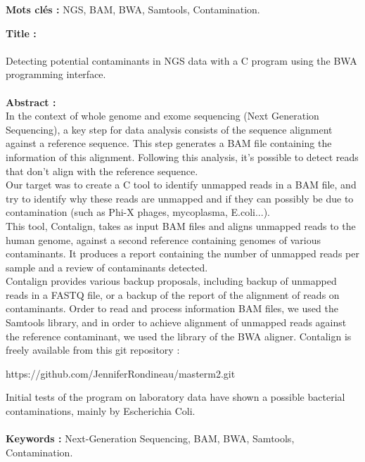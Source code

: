 \documentclass[a4paper,12pt]{article}
\begin{document}
\textbf{Mots clés :} NGS, BAM, BWA, Samtools, Contamination. \\
\clearpage

\textbf{Title :} \\\\
Detecting potential contaminants in NGS data with a C program using the BWA programming interface. \\
\\
\textbf{Abstract :} \\

In the context of whole genome and exome sequencing (Next Generation Sequencing), a key step for data analysis consists of the sequence alignment against a reference sequence. This step generates a BAM file containing the information of this alignment. Following this analysis, it's possible to detect reads that don't align with the reference sequence. \\
Our target was to create a C tool to identify unmapped reads in a BAM file, and try to identify why these reads are unmapped and if they can possibly be due to contamination (such as Phi-X phages, mycoplasma, E.coli...).\\
This tool, Contalign, takes as input BAM files and aligns unmapped reads to the human genome, against a second reference containing genomes of various contaminants. It produces a report containing the number of unmapped reads per sample and a review of contaminants detected. \\
Contalign provides various backup proposals, including backup of unmapped reads in a FASTQ file, or a backup of the report of the alignment of reads on contaminants. Order to read and process information BAM files, we used the Samtools library, and in order to achieve alignment of unmapped reads against the reference contaminant, we used the library of the BWA aligner. Contalign is freely available from this git repository : \begin{center} https://github.com/JenniferRondineau/masterm2.git \end{center}
Initial tests of the program on laboratory data have shown a possible bacterial contaminations, mainly by Escherichia Coli.\\\\

\textbf{Keywords :} Next-Generation Sequencing, BAM, BWA, Samtools, Contamination.
\clearpage %
\renewcommand{\contentsname}{Sommaire} 
\tableofcontents{} %
\clearpage
\end{document}
